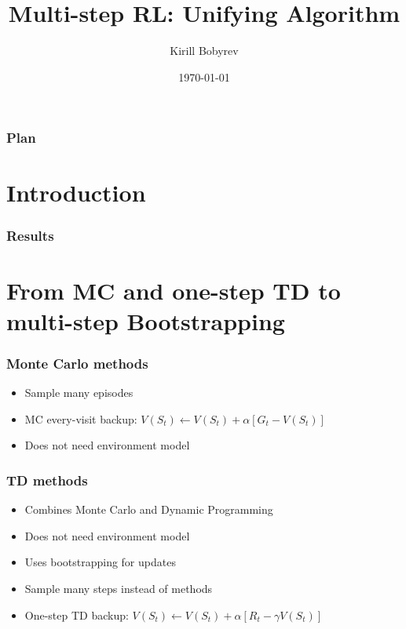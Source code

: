 \documentclass{beamer}
\title{Multi-step RL: Unifying Algorithm}
\author{Kirill Bobyrev}
\date{\today}
\begin{document}
\begin{frame}
  \titlepage
\end{frame}

\begin{frame}
  \frametitle{Plan}
  \tableofcontents
\end{frame}


\section{Introduction}

\begin{frame}
  \frametitle{Results}
\end{frame}

\section{From MC and one-step TD to multi-step Bootstrapping}

\begin{frame}
  \frametitle{Monte Carlo methods}
  \begin{itemize}
    \item Sample many episodes
    \item MC every-visit backup: $V(S_t) \leftarrow V(S_t) +
      \alpha[G_t - V(S_t)]$
    \item Does not need environment model
  \end{itemize}
\end{frame}

\begin{frame}
  \frametitle{TD methods}
  \begin{itemize}
    \item Combines Monte Carlo and Dynamic Programming
    \item Does not need environment model
    \item Uses bootstrapping for updates
    \item Sample many steps instead of methods
    \item One-step TD backup: $V(S_t) \leftarrow V(S_t) +
      \alpha[R_t - \gamma V(S_t)]$
  \end{itemize}
\end{frame}
\end{document}

